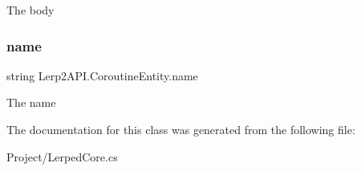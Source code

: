 The body 

\mbox{\label{class_lerp2_a_p_i_1_1_coroutine_entity_ad0f1956413a51bfb0f84dc5700e370c5}} 
\subsubsection{\texorpdfstring{name}{name}}
{\footnotesize\ttfamily string Lerp2\+A\+P\+I.\+Coroutine\+Entity.\+name}



The name 



The documentation for this class was generated from the following file\+:\begin{DoxyCompactItemize}
\item 
Project/Lerped\+Core.\+cs\end{DoxyCompactItemize}
